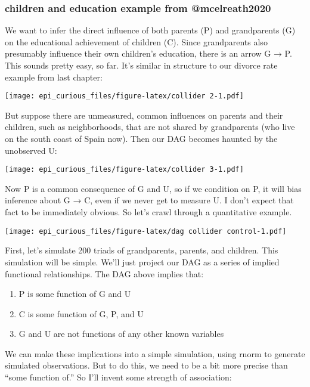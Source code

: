 \documentclass[
]{article}
\begin{document}
\hypertarget{children-and-education-example-from-mcelreath2020}{%
\subsubsection{children and education example from
@mcelreath2020}\label{children-and-education-example-from-mcelreath2020}}

We want to infer the direct influence of both parents (P) and
grandparents (G) on the educational achievement of children (C). Since
grandparents also presumably influence their own children's education,
there is an arrow G → P. This sounds pretty easy, so far. It's similar
in structure to our divorce rate example from last chapter:

\texttt{[image: epi\_curious\_files/figure-latex/collider 2-1.pdf]}

But suppose there are unmeasured, common influences on parents and their
children, such as neighborhoods, that are not shared by grandparents
(who live on the south coast of Spain now). Then our DAG becomes haunted
by the unobserved U:

\texttt{[image: epi\_curious\_files/figure-latex/collider 3-1.pdf]}

Now P is a common consequence of G and U, so if we condition on P, it
will bias inference about G → C, even if we never get to measure U. I
don't expect that fact to be immediately obvious. So let's crawl through
a quantitative example.

\texttt{[image: epi\_curious\_files/figure-latex/dag collider control-1.pdf]}

First, let's simulate 200 triads of grandparents, parents, and children.
This simulation will be simple. We'll just project our DAG as a series
of implied functional relationships. The DAG above implies that:

\begin{enumerate}
\def\labelenumi{(\arabic{enumi})}
\item
  P is some function of G and U
\item
  C is some function of G, P, and U
\item
  G and U are not functions of any other known variables
\end{enumerate}

We can make these implications into a simple simulation, using rnorm to
generate simulated observations. But to do this, we need to be a bit
more precise than ``some function of.'' So I'll invent some strength of
association:
\end{document}
